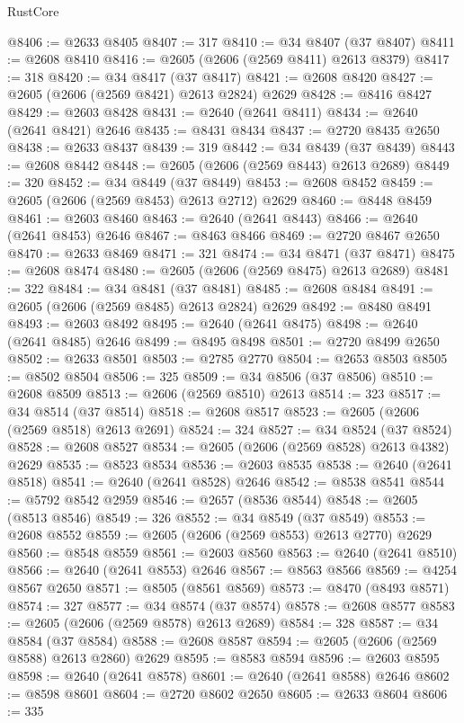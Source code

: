 \begin{lexlean}{RustCore}
\begin{coremodule}
@8406 := @2633 @8405
@8407 := 317
@8410 := @34 @8407 (@37 @8407)
@8411 := @2608 @8410
@8416 := @2605 (@2606 (@2569 @8411) @2613 @8379)
@8417 := 318
@8420 := @34 @8417 (@37 @8417)
@8421 := @2608 @8420
@8427 := @2605 (@2606 (@2569 @8421) @2613 @2824) @2629
@8428 := @8416 @8427
@8429 := @2603 @8428
@8431 := @2640 (@2641 @8411)
@8434 := @2640 (@2641 @8421) @2646
@8435 := @8431 @8434
@8437 := @2720 @8435 @2650
@8438 := @2633 @8437
@8439 := 319
@8442 := @34 @8439 (@37 @8439)
@8443 := @2608 @8442
@8448 := @2605 (@2606 (@2569 @8443) @2613 @2689)
@8449 := 320
@8452 := @34 @8449 (@37 @8449)
@8453 := @2608 @8452
@8459 := @2605 (@2606 (@2569 @8453) @2613 @2712) @2629
@8460 := @8448 @8459
@8461 := @2603 @8460
@8463 := @2640 (@2641 @8443)
@8466 := @2640 (@2641 @8453) @2646
@8467 := @8463 @8466
@8469 := @2720 @8467 @2650
@8470 := @2633 @8469
@8471 := 321
@8474 := @34 @8471 (@37 @8471)
@8475 := @2608 @8474
@8480 := @2605 (@2606 (@2569 @8475) @2613 @2689)
@8481 := 322
@8484 := @34 @8481 (@37 @8481)
@8485 := @2608 @8484
@8491 := @2605 (@2606 (@2569 @8485) @2613 @2824) @2629
@8492 := @8480 @8491
@8493 := @2603 @8492
@8495 := @2640 (@2641 @8475)
@8498 := @2640 (@2641 @8485) @2646
@8499 := @8495 @8498
@8501 := @2720 @8499 @2650
@8502 := @2633 @8501
@8503 := @2785 @2770
@8504 := @2653 @8503
@8505 := @8502 @8504
@8506 := 325
@8509 := @34 @8506 (@37 @8506)
@8510 := @2608 @8509
@8513 := @2606 (@2569 @8510) @2613
@8514 := 323
@8517 := @34 @8514 (@37 @8514)
@8518 := @2608 @8517
@8523 := @2605 (@2606 (@2569 @8518) @2613 @2691)
@8524 := 324
@8527 := @34 @8524 (@37 @8524)
@8528 := @2608 @8527
@8534 := @2605 (@2606 (@2569 @8528) @2613 @4382) @2629
@8535 := @8523 @8534
@8536 := @2603 @8535
@8538 := @2640 (@2641 @8518)
@8541 := @2640 (@2641 @8528) @2646
@8542 := @8538 @8541
@8544 := @5792 @8542 @2959
@8546 := @2657 (@8536 @8544)
@8548 := @2605 (@8513 @8546)
@8549 := 326
@8552 := @34 @8549 (@37 @8549)
@8553 := @2608 @8552
@8559 := @2605 (@2606 (@2569 @8553) @2613 @2770) @2629
@8560 := @8548 @8559
@8561 := @2603 @8560
@8563 := @2640 (@2641 @8510)
@8566 := @2640 (@2641 @8553) @2646
@8567 := @8563 @8566
@8569 := @4254 @8567 @2650
@8571 := @8505 (@8561 @8569)
@8573 := @8470 (@8493 @8571)
@8574 := 327
@8577 := @34 @8574 (@37 @8574)
@8578 := @2608 @8577
@8583 := @2605 (@2606 (@2569 @8578) @2613 @2689)
@8584 := 328
@8587 := @34 @8584 (@37 @8584)
@8588 := @2608 @8587
@8594 := @2605 (@2606 (@2569 @8588) @2613 @2860) @2629
@8595 := @8583 @8594
@8596 := @2603 @8595
@8598 := @2640 (@2641 @8578)
@8601 := @2640 (@2641 @8588) @2646
@8602 := @8598 @8601
@8604 := @2720 @8602 @2650
@8605 := @2633 @8604
@8606 := 335

\end{coremodule}
\end{lexlean}
